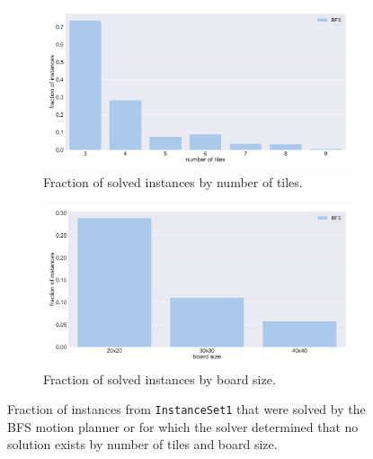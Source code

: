 \begin{figure}[H]
\begin{subfigure}[b]{\textwidth}
\centering
\includegraphics[width=\textwidth]{figures/plots/heuristic_solvers_i1/bfs_fraction_solved_over_tiles.pdf}
\caption {Fraction of solved instances by number of tiles.}
\label{fig:bfs_fraction_solved_over_tiles}
\end{subfigure}
\begin{subfigure}[b]{\textwidth}
\centering
\includegraphics[width=\textwidth]{figures/plots/heuristic_solvers_i1/bfs_fraction_solved_over_board_size.pdf}
\caption{Fraction of solved instances by board size.}
\label{fig:bfs_fraction_solved_over_board_size}
\end{subfigure}
\caption [Fraction of \texttt{InstanceSet1} solved by the BFS motion planner] {Fraction of instances from \texttt{InstanceSet1} that were solved by the BFS motion planner or for which the solver determined that no solution exists by number of tiles and board size.}
\label{fig:bfs_performance2}
\end{figure}
